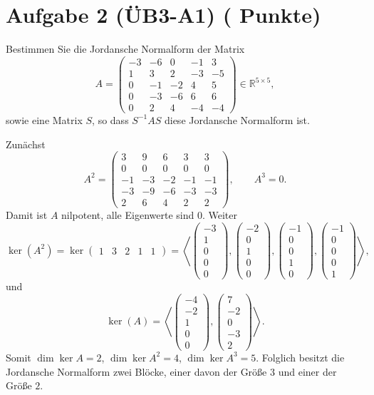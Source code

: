 \documentclass[11pt, a4paper]{article}
\newcommand{\aufgabe}[2]{%
  \section*{\Large\bfseries Aufgabe #1%
  \if\relax\detokenize{#2}\relax\else \hfill\normalfont\normalsize(#2 Punkte)\fi}%
  \vspace{-1.5ex}
}
\begin{document}
\aufgabe{2 (ÜB3-A1)}{}
Bestimmen Sie die Jordansche Normalform der Matrix
\[
A=
\begin{pmatrix}
-3 & -6 & 0 & -1 & 3\\
 1 &  3 & 2 & -3 & -5\\
 0 & -1 & -2 &  4 & 5\\
 0 & -3 & -6 &  6 & 6\\
 0 &  2 & 4 & -4 & -4
\end{pmatrix}\in\mathbb{R}^{5\times 5},
\]
sowie eine Matrix $S$, so dass $S^{-1}AS$ diese Jordansche Normalform ist.
\begin{framed}
Zunächst
\[
A^2=
\begin{pmatrix}
3 & 9 & 6 & 3 & 3\\
0 & 0 & 0 & 0 & 0\\
-1 & -3 & -2 & -1 & -1\\
-3 & -9 & -6 & -3 & -3\\
2 & 6 & 4 & 2 & 2
\end{pmatrix},
\qquad
A^3=0.
\]
Damit ist $A$ nilpotent, alle Eigenwerte sind $0$. Weiter
\[
\ker(A^2)=\ker\!\begin{pmatrix}1&3&2&1&1\end{pmatrix}
=\left\langle
\begin{pmatrix}-3\\1\\0\\0\\0\end{pmatrix},
\begin{pmatrix}-2\\0\\1\\0\\0\end{pmatrix},
\begin{pmatrix}-1\\0\\0\\1\\0\end{pmatrix},
\begin{pmatrix}-1\\0\\0\\0\\1\end{pmatrix}
\right\rangle,
\]
und
\[
\ker(A)=\left\langle
\begin{pmatrix}-4\\-2\\1\\0\\0\end{pmatrix},
\begin{pmatrix}7\\-2\\0\\-3\\2\end{pmatrix}
\right\rangle.
\]
Somit $\dim\ker A=2$, $\dim\ker A^2=4$, $\dim\ker A^3=5$. Folglich besitzt die
Jordansche Normalform zwei Blöcke, einer davon der Größe $3$ und einer der Größe $2$.


\end{framed}
\end{document}
